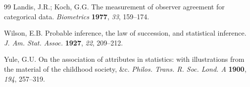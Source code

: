 \documentclass[remotesensing,article,submit,moreauthors]{Definitions/mdpi}
\begin{document}
\begin{thebibliography}{99}
Landis, J.R.; Koch, G.G.
The measurement of observer agreement for categorical data.
\textit{Biometrics} \textbf{1977}, \textit{33}, 159--174.

Wilson, E.B.
Probable inference, the law of succession, and statistical inference.
\textit{J. Am. Stat. Assoc.} \textbf{1927}, \textit{22}, 209--212.

Yule, G.U.
On the association of attributes in statistics: with illustrations from the
material of the childhood society, \&c. \textit{Philos. Trans. R. Soc. Lond. A}
\textbf{1900}, \textit{194}, 257--319.

\end{thebibliography}
\end{document}
